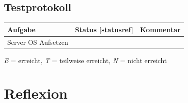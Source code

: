 \documentclass[12pt,a4paper,twoside,titlepage]{article}
\begin{document}
        \subsection{Testprotokoll}


        \begin{tabular}{|l|l|p{5cm}|}
          \hline
          \textbf{Aufgabe} & \textbf{Status \ref{statusref}} & \textbf{Kommentar} \\\hline
          Server OS Aufsetzen & & \\\hline
        \end{tabular}

        \label{statusref}
        \textit{E} = erreicht, \textit{T} = teilweise erreicht, \textit{N} = nicht erreicht 
        
        \section{Reflexion}
        
        
\end{document}
